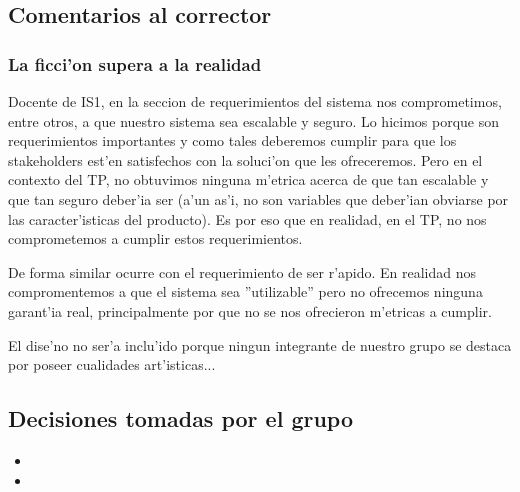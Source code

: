 \subsection{Comentarios al corrector}
\subsubsection{La ficci'on supera a la realidad}
Docente de IS1, en la seccion de requerimientos del sistema nos comprometimos, entre otros, a que nuestro sistema sea escalable y seguro. Lo hicimos porque son requerimientos importantes y como tales deberemos cumplir para que los stakeholders est'en satisfechos con la soluci'on que les ofreceremos. Pero en el contexto del TP, no obtuvimos ninguna m'etrica acerca de que tan escalable y que tan seguro deber'ia ser (a'un as'i, no son variables que deber'ian obviarse por las caracter'isticas del producto). Es por eso que en realidad, en el TP, no nos comprometemos a cumplir estos requerimientos. 

De forma similar ocurre con el requerimiento de ser r'apido. En realidad nos compromentemos a que el sistema sea ''utilizable'' pero no ofrecemos ninguna garant'ia real, principalmente por que no se nos ofrecieron m'etricas a cumplir.

El dise'no no ser'a inclu'ido porque ningun integrante de nuestro grupo se destaca por poseer cualidades art'isticas...





\subsection{Decisiones tomadas por el grupo}
\begin{itemize}
\item 
\item 

\end{itemize}
